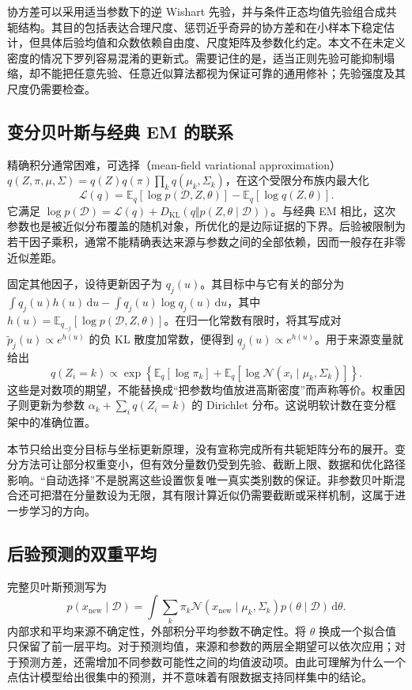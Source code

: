 \documentclass[UTF8]{ctexart}
\begin{document}
协方差可以采用适当参数下的逆 Wishart 先验，并与条件正态均值先验组合成共轭结构。其目的包括表达合理尺度、惩罚近乎奇异的协方差和在小样本下稳定估计，但具体后验均值和众数依赖自由度、尺度矩阵及参数化约定。本文不在未定义密度的情况下罗列容易混淆的更新式。需要记住的是，适当正则先验可能抑制塌缩，却不能把任意先验、任意近似算法都视为保证可靠的通用修补；先验强度及其尺度仍需要检查。

\subsection{变分贝叶斯与经典 EM 的联系}
精确积分通常困难，可选择（mean-field variational approximation）
$q(Z,\pi,\mu,\Sigma)=q(Z)q(\pi)\prod_kq(\mu_k,\Sigma_k)$，在这个受限分布族内最大化
\begin{equation}
\mathcal L(q)=\mathbb E_q[\log p(\mathcal D,Z,\theta)]
-\mathbb E_q[\log q(Z,\theta)].
\label{eq:gmm-bayesian-elbo}
\end{equation}
它满足 $\log p(\mathcal D)=\mathcal L(q)+D_{\mathrm{KL}}(q\Vert p(Z,\theta\mid\mathcal D))$。与经典 EM 相比，这次参数也是被近似分布覆盖的随机对象，所优化的是边际证据的下界。后验被限制为若干因子乘积，通常不能精确表达来源与参数之间的全部依赖，因而一般存在非零近似差距。

固定其他因子，设待更新因子为 $q_j(u)$。其目标中与它有关的部分为 $\int q_j(u)h(u)\,\mathrm du-\int q_j(u)\log q_j(u)\,\mathrm du$，其中 $h(u)=\mathbb E_{q_{-j}}[\log p(\mathcal D,Z,\theta)]$。在归一化常数有限时，将其写成对 $\widetilde p_j(u)\propto e^{h(u)}$ 的负 KL 散度加常数，便得到 $q_j(u)\propto e^{h(u)}$。用于来源变量就给出
\begin{equation}
q(Z_i=k)\propto\exp\left\{\mathbb E_q[\log\pi_k]
+\mathbb E_q[\log\mathcal N(x_i\mid\mu_k,\Sigma_k)]\right\}.
\label{eq:gmm-vb-responsibility}
\end{equation}
这些是对数项的期望，不能替换成“把参数均值放进高斯密度”而声称等价。权重因子则更新为参数 $\alpha_k+\sum_iq(Z_i=k)$ 的 Dirichlet 分布。这说明软计数在变分框架中的准确位置。

本节只给出变分目标与坐标更新原理，没有宣称完成所有共轭矩阵分布的展开。变分方法可让部分权重变小，但有效分量数仍受到先验、截断上限、数据和优化路径影响。“自动选择”不是脱离这些设置恢复唯一真实类别数的保证。非参数贝叶斯混合还可把潜在分量数设为无限，其有限计算近似仍需要截断或采样机制，这属于进一步学习的方向。

\subsection{后验预测的双重平均}
完整贝叶斯预测写为
\[
p(x_{\mathrm{new}}\mid\mathcal D)=\int\sum_k\pi_k
\mathcal N(x_{\mathrm{new}}\mid\mu_k,\Sigma_k)
p(\theta\mid\mathcal D)\,\mathrm d\theta.
\]
内部求和平均来源不确定性，外部积分平均参数不确定性。将 $\theta$ 换成一个拟合值只保留了前一层平均。对于预测均值，来源和参数的两层全期望可以依次应用；对于预测方差，还需增加不同参数可能性之间的均值波动项。由此可理解为什么一个点估计模型给出很集中的预测，并不意味着有限数据支持同样集中的结论。
\end{document}
